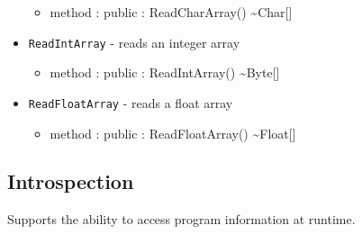 \documentclass[11pt]{article}
\begin{document}
\begin{itemize}
\begin{itemize}
  \item method : public : ReadCharArray() \textasciitilde Char[]
  \end{itemize}
\item \texttt{ReadIntArray} - reads an integer array
  \begin{itemize}
  \item method : public : ReadIntArray() \textasciitilde Byte[]
  \end{itemize}
\item \texttt{ReadFloatArray} - reads a float array
  \begin{itemize}
  \item method : public : ReadFloatArray() \textasciitilde Float[]
  \end{itemize}
\end{itemize}

\subsection{Introspection}
Supports the ability to access program information at runtime.
\end{document}
